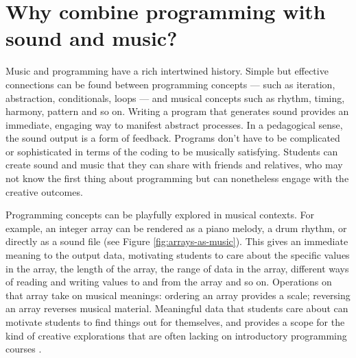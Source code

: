 







\section{Why combine programming with sound and music?} \label{sec:why}

Music and programming have a rich intertwined history. Simple but effective connections can be found between programming concepts --- such as iteration, abstraction, conditionals, loops --- and musical concepts such as rhythm, timing, harmony, pattern and so on. Writing a program that generates sound provides an immediate, engaging way to manifest abstract processes. In a pedagogical sense, the sound output is a form of feedback. Programs don't have to be complicated or sophisticated in terms of the coding to be musically satisfying. Students can create sound and music that they can share with friends and relatives, who may not know the first thing about programming but can nonetheless engage with the creative outcomes. 


Programming concepts can be playfully explored in musical contexts. For example, an integer array can be rendered as a piano melody, a drum rhythm, or directly as a sound file (see Figure \ref{fig:arrays-as-music}). This gives an immediate meaning to the output data, motivating students to care about the specific values in the array, the length of the array, the range of data in the array, different ways of reading and writing values to and from the array and so on. Operations on that array take on musical meanings: ordering an array provides a scale; reversing an array reverses musical material. Meaningful data that students care about can motivate students to find things out for themselves, and provides a scope for the kind of creative explorations that are often lacking on introductory programming courses \cite{sharmin_creativity_2021}.

